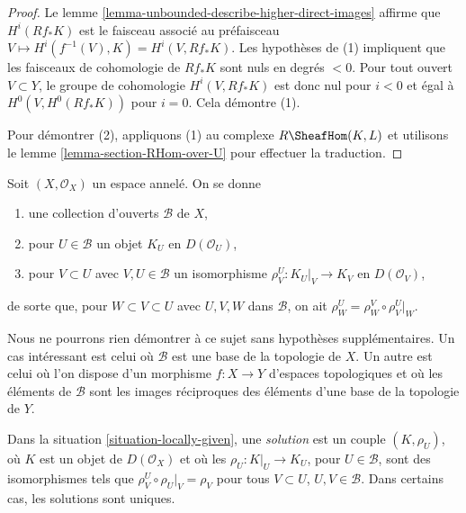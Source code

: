 \begin{proof}
Le lemme \ref{lemma-unbounded-describe-higher-direct-images} affirme que $H^i(Rf_*K)$ est le faisceau associé au préfaisceau $V \mapsto H^i(f^{-1}(V), K) = H^i(V, Rf_*K)$. Les hypothèses de (1) impliquent que les faisceaux de cohomologie de $Rf_*K$ sont nuls en degrés $< 0$. Pour tout ouvert $V \subset Y$, le groupe de cohomologie $H^i(V, Rf_*K)$ est donc nul pour $i < 0$ et égal à $H^0(V, H^0(Rf_*K))$ pour $i = 0$. Cela démontre (1).

\medskip\noindent

Pour démontrer (2), appliquons (1) au complexe $R\SheafHom(K, L)$ et utilisons le lemme \ref{lemma-section-RHom-over-U} pour effectuer la traduction.

\end{proof}

\begin{situation}

\label{situation-locally-given}

Soit $(X, \mathcal{O}_X)$ un espace annelé. On se donne

\begin{enumerate}

\item une collection d'ouverts $\mathcal{B}$ de $X$,
\item pour $U \in \mathcal{B}$ un objet $K_U$ en $D(\mathcal{O}_U)$,
\item pour $V \subset U$ avec $V, U \in \mathcal{B}$ un isomorphisme
$\rho^U_V : K_U|_V \to K_V$ en $D(\mathcal{O}_V)$,

\end{enumerate}

de sorte que, pour $W \subset V \subset U$ avec $U, V, W$ dans
$\mathcal{B}$, on ait $\rho^U_W = \rho^V_W \circ \rho ^U_V|_W$.

\end{situation}

\noindent
Nous ne pourrons rien démontrer à ce sujet sans hypothèses supplémentaires. Un cas intéressant est celui où $\mathcal{B}$ est une base de la topologie de $X$. Un autre est celui où l'on dispose d'un morphisme $f : X \to Y$ d'espaces topologiques et où les éléments de $\mathcal{B}$ sont les images réciproques des éléments d'une base de la topologie de $Y$.

\medskip\noindent
Dans la situation \ref{situation-locally-given}, une {\it solution} est un couple $(K, \rho_U)$, où $K$ est un objet de $D(\mathcal{O}_X)$ et où les $\rho_U : K|_U \to K_U$, pour $U \in \mathcal{B}$, sont des isomorphismes tels que $\rho^U_V \circ \rho_U|_V = \rho_V$ pour tous $V \subset U$, $U, V \in \mathcal{B}$. Dans certains cas, les solutions sont uniques.

